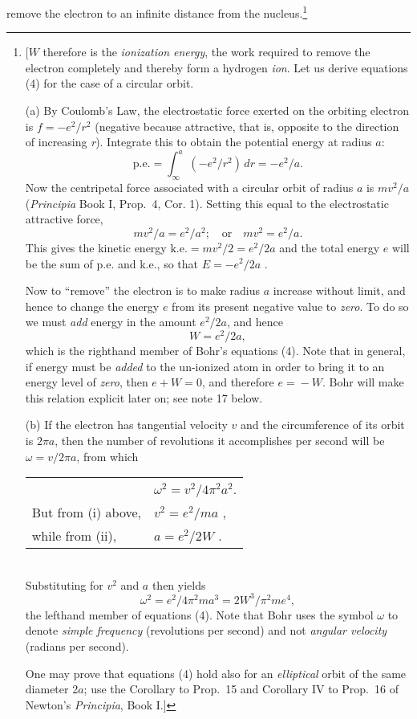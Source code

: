 remove the electron to an infinite distance from the nucleus.\footnote{{[}$W$
  therefore is the \emph{ionization energy}, the work required to remove
  the electron completely and thereby form a hydrogen \emph{ion}. Let us
  derive equations (4) for the case of a circular orbit.

  (a) By Coulomb's Law, the electrostatic force exerted on the orbiting
  electron is $f = -e^2/r^2$ (negative because attractive, that
  is, opposite to the direction of increasing \emph{r}). Integrate this
  to obtain the potential energy at radius $a$:
  \begin{equation*}
  \text{p.e.}  = \int_{\infty}^{a} \left(-e^2/r^2\right)\,dr = - e^2/a .
  \end{equation*}
  Now the centripetal force associated with a circular orbit of radius
  $a$ is $mv^2/a$ (\emph{Principia} Book I, Prop.\ 4,
  Cor. 1). Setting this equal to the electrostatic attractive force,
  \begin{equation*}\tag{i}
  mv^2/a = e^2/a^2 ; \quad\text{or}\quad mv^2 = e^2/a .
  \end{equation*}
  This gives the kinetic energy $\text{k.e.} = mv^2/2 = e^2/2a$
  and the total energy $e$ will be the sum of p.e. and k.e., so
  that $E = -e^2/2a$ .

  Now to ``remove'' the electron is to make radius $a$ increase
  without limit, and hence to change the energy $e$ from its
  present negative value to \emph{zero}. To do so we must \emph{add}
  energy in the amount $e^2/2a$, and hence
  \begin{equation*}\tag{ii}
  W = e^2/2a ,
  \end{equation*}
  which is the righthand member of Bohr's equations (4). Note that in
  general, if energy must be \emph{added} to the un-ionized atom in
  order to bring it to an energy level of \emph{zero}, then
  $e + W = 0$, and therefore $e\! =\! -W$. Bohr will
  make this relation explicit later on; see note 17 below.

  (b) If the electron has tangential velocity $v$ and the
  circumference of its orbit is $2\pi a$, then the number of
  revolutions it accomplishes per second will be $\omega = v/2\pi a$, from which
  \begin{tabular}{ l l }
   & $\omega^2 = v^2/4\pi^2a^2 $.\\
  But from (i) above, & $v^2 = e^2/ma$ ,\\
  while from (ii), & $a = e^2/2W$ .\\
  \end{tabular}\\  
  Substituting for $v^2$ and $a$ then yields
  \begin{equation*}
  \omega^2 = e^2/4\pi^2ma^3 = 2W^3/\pi^2me^4 ,
  \end{equation*}
  the lefthand member of equations (4). Note that Bohr uses the symbol
  $\omega$ to denote \emph{simple frequency} (revolutions per second)
  and not \emph{angular velocity} (radians per second).

  One may prove that equations (4) hold also for an \emph{elliptical}
  orbit of the same diameter 2$a$; use the Corollary to Prop.\ 15
  and Corollary IV to Prop.\ 16 of Newton's \emph{Principia}, Book I.{]}}


